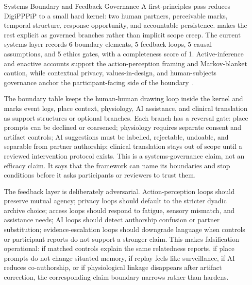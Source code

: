 \documentclass[
  ignorenonframetext,
]{beamer}
\begin{document}
\begin{frame}{Systems Boundary and Feedback
Governance}
\protect{}\label{systems-boundary-and-feedback-governance}
A first-principles pass reduces DigiPPPiP to a small hard kernel: two
human partners, perceivable marks, temporal structure, response
opportunity, and accountable persistence.
 makes the rest explicit as governed
branches rather than implicit scope creep. The current systems layer
records 6 boundary elements, 5 feedback loops, 5 causal assumptions, and
5 ethics gates, with a completeness score of 1. Active-inference and
enactive accounts support the action-perception framing and
Markov-blanket caution, while contextual privacy, values-in-design, and
human-subjects governance anchor the participant-facing side of the
boundary .

The boundary table keeps the human-human drawing loop inside the kernel
and marks event logs, place context, physiology, AI assistance, and
clinical translation as support structures or optional branches. Each
branch has a reversal gate: place prompts can be declined or coarsened;
physiology requires separate consent and artifact controls; AI
suggestions must be labelled, rejectable, undoable, and separable from
partner authorship; clinical translation stays out of scope until a
reviewed intervention protocol exists. This is a systems-governance
claim, not an efficacy claim. It says that the framework can name its
boundaries and stop conditions before it asks participants or reviewers
to trust them.

The feedback layer is deliberately adversarial. Action-perception loops
should preserve mutual agency; privacy loops should default to the
stricter dyadic archive choice; access loops should respond to fatigue,
sensory mismatch, and assistance needs; AI loops should detect
authorship confusion or partner substitution; evidence-escalation loops
should downgrade language when controls or participant reports do not
support a stronger claim. This makes falsification operational: if
matched controls explain the same relatedness reports, if place prompts
do not change situated memory, if replay feels like surveillance, if AI
reduces co-authorship, or if physiological linkage disappears after
artifact correction, the corresponding claim boundary narrows rather
than hardens.
\end{frame}
\end{document}
